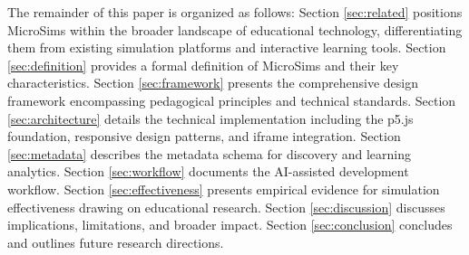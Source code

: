 The remainder of this paper is organized as follows: Section \ref{sec:related} positions MicroSims within the broader landscape of educational technology, differentiating them from existing simulation platforms and interactive learning tools. Section \ref{sec:definition} provides a formal definition of MicroSims and their key characteristics. Section \ref{sec:framework} presents the comprehensive design framework encompassing pedagogical principles and technical standards. Section \ref{sec:architecture} details the technical implementation including the p5.js foundation, responsive design patterns, and iframe integration. Section \ref{sec:metadata} describes the metadata schema for discovery and learning analytics. Section \ref{sec:workflow} documents the AI-assisted development workflow. Section \ref{sec:effectiveness} presents empirical evidence for simulation effectiveness drawing on educational research. Section \ref{sec:discussion} discusses implications, limitations, and broader impact. Section \ref{sec:conclusion} concludes and outlines future research directions.
